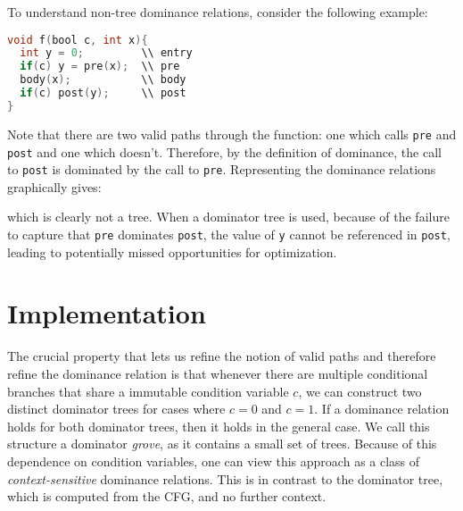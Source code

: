 \documentclass[a4paper,twocolumn]{article}
\begin{document}
To understand non-tree dominance relations, consider the following example: 
\begin{minipage}{\linewidth}
\begin{lstlisting}[language=C]
void f(bool c, int x){
  int y = 0;         \\ entry
  if(c) y = pre(x);  \\ pre
  body(x);           \\ body	
  if(c) post(y);     \\ post
}
\end{lstlisting}
\end{minipage}
Note that there are two valid paths through the function: one which calls
\texttt{pre} and \texttt{post} and one which doesn't. Therefore, by the
definition of dominance, the call to \texttt{post} is dominated by the call to
\texttt{pre}. Representing the dominance relations graphically gives: 
\begin{center}
\end{center} 
which is clearly not a tree. When a dominator tree is used, because of the
failure to capture that \texttt{pre} dominates \texttt{post}, the value of
\texttt{y} cannot be referenced in \texttt{post}, leading to potentially
missed opportunities for optimization.

\section*{Implementation}
The crucial property that lets us refine the notion of valid paths and
therefore refine the dominance relation is that whenever there are multiple
conditional branches that share a immutable condition variable $c$, we can construct
two distinct dominator trees for cases where $c=0$ and $c=1$. If a dominance
relation holds for both dominator trees, then it holds in the general case. We
call this structure a dominator \emph{grove}, as it contains a small set of
trees. Because of this dependence on condition variables, one can view this
approach as a class of \emph{context-sensitive} dominance relations. This is in
contrast to the dominator tree, which is computed from the CFG, and no further
context.
\end{document}
